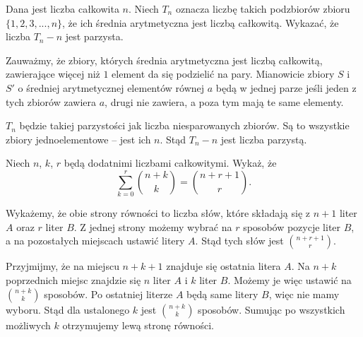 \begin{problem}{6}
	Dana jest liczba całkowita $n$. Niech $T_n$ oznacza liczbę takich podzbiorów zbioru $\{1, 2, 3, ..., n\}$, że ich średnia arytmetyczna jest liczbą całkowitą. Wykazać, że liczba $T_n - n$ jest parzysta.
\end{problem}

\vspace{5px}

\noindent
Zauważmy, że zbiory, których średnia arytmetyczna jest liczbą całkowitą, zawierające więcej niż $1$ element da się podzielić na pary. Mianowicie zbiory $S$ i $S'$ o średniej arytmetycznej elementów równej $a$ będą w jednej parze jeśli jeden z tych zbiorów zawiera $a$, drugi nie zawiera, a poza tym mają te same elementy.

$T_n$ będzie takiej parzystości jak liczba niesparowanych zbiorów. Są to wszystkie zbiory jednoelementowe -- jest ich $n$.  Stąd $T_n - n$ jest liczba parzystą.

\vspace{5px}

\begin{problem}{7}
	Niech $n$, $k$, $r$ będą dodatnimi liczbami całkowitymi. Wykaż, że
	\[
		\sum^{r}_{k=0} {{n + k}\choose{k}} = {{n + r + 1}\choose{r}} .
	\]
\end{problem}

\vspace{5px}

\noindent
Wykażemy, że obie strony równości to liczba słów, które składają się z $n + 1$ liter $A$ oraz $r$ liter $B$. Z jednej strony możemy wybrać na $r$ sposobów pozycje liter $B$, a na pozostałych miejscach ustawić litery $A$. Stąd tych słów jest ${{n + r + 1}\choose{r}}$.

Przyjmijmy, że na miejscu $n + k + 1$ znajduje się ostatnia litera $A$. Na $n + k$ poprzednich miejsc znajdzie się $n$ liter $A$ i $k$ liter $B$. Możemy je więc ustawić na ${{n + k}\choose{k}}$ sposobów. Po ostatniej literze $A$ będą same litery $B$, więc nie mamy wyboru. Stąd dla ustalonego $k$ jest ${{n + k}\choose{k}}$ sposobów. Sumując po wszystkich możliwych $k$ otrzymujemy lewą stronę równości.


